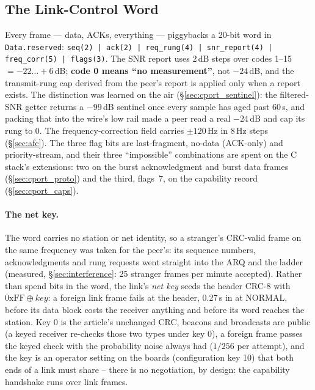 \subsection{The Link-Control Word}

Every frame --- data, ACKs, everything --- piggybacks a 20-bit word in
\texttt{Data.reserved}:
\texttt{seq(2)\,|\,ack(2)\,|\,req\_rung(4)\,|\,snr\_report(4)\,|\,%
freq\_corr(5)\,|\,flags(3)}.  The SNR report uses 2\,dB steps
over codes 1--15 $= -22\ldots+6$\,dB; \textbf{code 0 means ``no
measurement''}, not $-24$\,dB, and the transmit-rung cap derived from
the peer's report is applied only when a report exists.  The
distinction was learned on the air (\S\ref{sec:cport_sentinel}): the
filtered-SNR getter returns a $-99$\,dB sentinel once every sample has
aged past 60\,s, and packing that into the wire's low rail made a
peer read a real $-24$\,dB and cap its rung to 0.  The
frequency-correction field carries $\pm 120$\,Hz in 8\,Hz steps
(\S\ref{sec:afc}).  The three flag bits are last-fragment, no-data
(ACK-only) and priority-stream, and their three ``impossible''
combinations are spent on the C stack's extensions: two on the burst
acknowledgment and burst data frames (\S\ref{sec:cport_proto}) and the
third, flags~7, on the capability record (\S\ref{sec:cport_caps}).

\paragraph{The net key.}
\label{sec:net_key}
The word carries no station or net identity, so a stranger's CRC-valid
frame on the same frequency was taken for the peer's: its sequence
numbers, acknowledgments and rung requests went straight into the ARQ
and the ladder (measured, \S\ref{sec:interference}: 25 stranger frames
per minute accepted).  Rather than spend bits in the word, the link's
\emph{net key} seeds the header CRC-8 with $\mathrm{0xFF} \oplus
\mathit{key}$: a foreign link frame fails at the header, 0.27\,s in at
NORMAL, before its data block costs the receiver anything and before
its word reaches the station.  Key 0 is the article's unchanged CRC,
beacons and broadcasts are public (a keyed receiver re-checks those two
types under key 0), a foreign frame passes the keyed check with the
probability noise always had ($1/256$ per attempt), and the key is an
operator setting on the boards (configuration key 10) that both ends
of a link must share -- there is no negotiation, by design: the
capability handshake runs over link frames.


